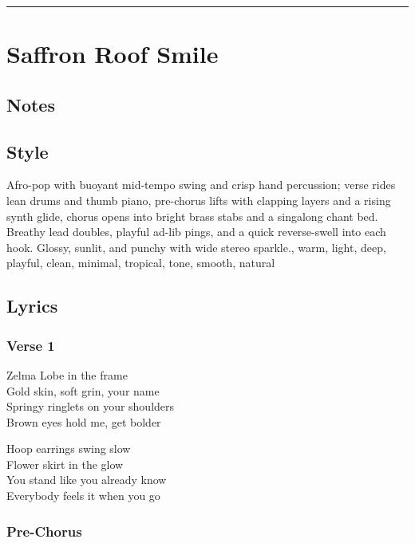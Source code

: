 \begin{center}\rule{0.5\linewidth}{0.5pt}\end{center}

\section{Saffron Roof Smile}\label{saffron-roof-smile}

\subsection{Notes}\label{notes-43}

\subsection{Style}\label{style-41}

Afro-pop with buoyant mid-tempo swing and crisp hand percussion; verse
rides lean drums and thumb piano, pre-chorus lifts with clapping layers
and a rising synth glide, chorus opens into bright brass stabs and a
singalong chant bed. Breathy lead doubles, playful ad-lib pings, and a
quick reverse-swell into each hook. Glossy, sunlit, and punchy with wide
stereo sparkle., warm, light, deep, playful, clean, minimal, tropical,
tone, smooth, natural

\subsection{Lyrics}\label{lyrics-41}

\subsubsection{Verse 1}\label{verse-1-24}

Zelma Lobe in the frame\\
Gold skin, soft grin, your name\\
Springy ringlets on your shoulders\\
Brown eyes hold me, get bolder

Hoop earrings swing slow\\
Flower skirt in the glow\\
You stand like you already know\\
Everybody feels it when you go

\subsubsection{Pre-Chorus}\label{pre-chorus-31}

